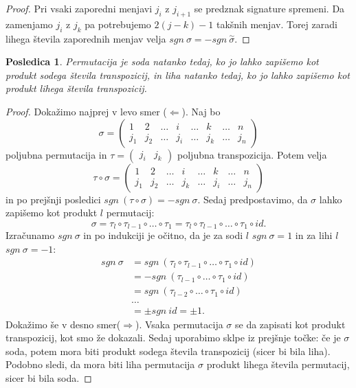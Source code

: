 \documentclass[10pt, a4paper]{article}
\newtheorem{posledica}[izr]{Posledica}
\newenvironment{noticeC}{%
  \tcolorbox[%
  notitle,
  empty,
  enhanced,  %
  breakable,
  coltext=black, 
  fontupper=\rmfamily,
  parbox=false,
  noparskip,
  sharp corners,
  boxrule=-1pt,  %
  frame hidden,
  left=7pt,  %
  right=7pt,
  top=5pt,
  bottom=5pt,
  before skip=2.5ex plus 2pt,
  after skip=2.5ex plus 2pt,
  overlay unbroken and last={%
  },
  ]}
{\endtcolorbox}
\newenvironment{dokaz}%
  {\begin{noticeC}\begin{proof}}%
  {\end{proof}\end{noticeC}}
\begin{document}
\begin{dokaz}
    Pri vsaki zaporedni menjavi $j_i$ z $j_{i+1}$ se predznak signature spremeni. Da zamenjamo
    $j_i$ z $j_k$ pa potrebujemo $2(j-k) - 1$ takšnih menjav. Torej zaradi lihega števila zaporednih menjav velja
    $sgn\ \sigma = - sgn\ \overset{\sim}{\sigma}.$
\end{dokaz}
    
\begin{posledica}
    Permutacija je soda natanko tedaj, ko jo lahko zapišemo kot produkt sodega števila transpozicij, in
     liha natanko tedaj, ko jo lahko zapišemo kot produkt lihega števila transpozicij.
\end{posledica}

\begin{dokaz}
    Dokažimo najprej v levo smer ($\Leftarrow$).
    Naj bo $$\sigma = \begin{pmatrix}
        1 & 2 & \dots & i & \dots & k & \dots & n\\
        j_1 & j_2 & \dots & j_i & \dots & j_{k} & \dots & j_n
    \end{pmatrix}$$ poljubna permutacija in 
    $\tau = \begin{pmatrix}
        j_i & j_k
    \end{pmatrix}$ poljubna transpozicija. Potem velja
    $$\tau \circ \sigma = \begin{pmatrix}
        1 & 2 & \dots & i & \dots & k & \dots & n\\
        j_1 & j_2 & \dots & j_k & \dots & j_i & \dots & j_n
    \end{pmatrix}$$
    in po prejšnji posledici
    $sgn\ (\tau \circ \sigma) = - sgn\ \sigma$.
    Sedaj predpostavimo, da $\sigma$ lahko zapišemo kot produkt $l$ permutacij:
    $$\sigma = \tau_l \circ \tau_{l-1} \circ \dots \circ \tau_1 = \tau_l \circ \tau_{l-1} \circ \dots \circ \tau_1 \circ id.$$ 
    Izračunamo $sgn\ \sigma$ in po indukciji je očitno, da je za sodi $l$ $sgn\ \sigma = 1$ in za lihi $l$ $sgn\ \sigma = -1$:
    \begin{align*}
        sgn\ \sigma &= sgn\ (\tau_l \circ \tau_{l-1} \circ \dots \circ \tau_1 \circ id)\\
        &= -sgn\ (\tau_{l-1} \circ \dots \circ \tau_1 \circ id) \\
        &= sgn\ (\tau_{l-2} \circ \dots \circ \tau_1 \circ id)\\
        &\dots \\
        &= \pm sgn\ id
        = \pm 1.
    \end{align*}
    Dokažimo še v desno smer($\Rightarrow$).
    Vsaka permutacija $\sigma$ se da zapisati kot produkt transpozicij, kot smo že dokazali. Sedaj uporabimo sklpe iz prejšnje točke:
    če je $\sigma$ soda, potem mora biti produkt sodega števila transpozicij (sicer bi bila liha). Podobno sledi, da mora biti liha permutacija $\sigma$ produkt lihega števila permutacij, sicer bi bila soda.
\end{dokaz}
\end{document}
